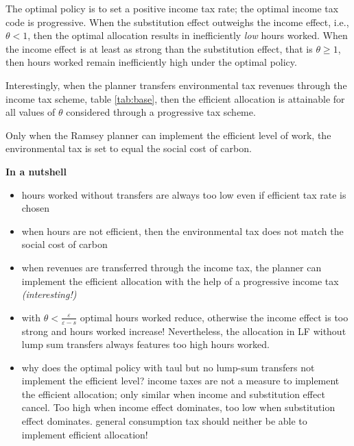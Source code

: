 The optimal policy is to set a positive income tax rate; the optimal income tax code is progressive. When the substitution effect outweighs the income effect, i.e., $\theta<1$, then the optimal allocation results in inefficiently \textit{low} hours worked. When the income effect is at least as strong than the substitution effect, that is $\theta\geq 1$, then hours worked remain inefficiently high under the optimal policy. 

Interestingly, when the planner transfers environmental tax revenues through the income tax scheme, table \ref{tab:base}, then the efficient allocation is attainable for all values of $\theta$ considered through a progressive tax scheme. 

Only when the Ramsey planner can implement the efficient level of work, the environmental tax is set to equal the social cost of carbon.   




\textbf{In a nutshell}
\begin{itemize}
	\item hours worked without transfers are always too low even if efficient tax rate is chosen
	\item when hours are not efficient, then the environmental tax does not match the social cost of carbon
	\item when revenues are transferred through the income tax, the planner can implement the efficient allocation with the help of a progressive income tax \textit{(interesting!)}
	\item with $\theta<\frac{\varepsilon}{\varepsilon-s}$ optimal hours worked reduce, otherwise the income effect is too strong and hours worked increase! 
	Nevertheless, the allocation in LF without lump sum transfers always features too high hours worked. 
	\item why does the optimal policy with taul but no lump-sum transfers not implement the efficient level? \ar income taxes are not a measure to implement the efficient allocation; only similar when income and substitution effect cancel. Too high when income effect dominates, too low when substitution effect dominates.
 \ar general consumption tax should neither be able to implement efficient allocation! 
\end{itemize}


